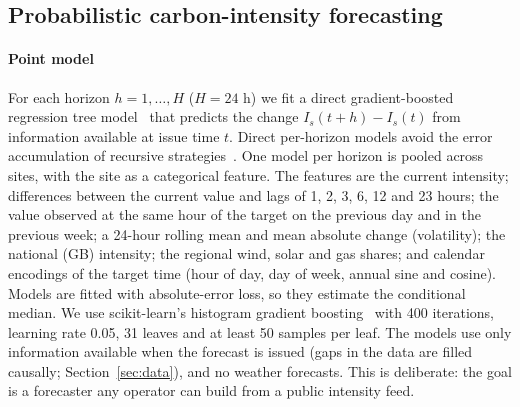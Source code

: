 \subsection{Probabilistic carbon-intensity forecasting}\label{sec:forecast}

\paragraph{Point model} For each horizon $h=1,\dots,H$ ($H=24$ h) we fit a direct gradient-boosted regression tree model~\cite{friedman2001greedy} that predicts the change $I_s(t+h)-I_s(t)$ from information available at issue time $t$. Direct per-horizon models avoid the error accumulation of recursive strategies~\cite{taieb2012review}. One model per horizon is pooled across sites, with the site as a categorical feature. The features are the current intensity; differences between the current value and lags of 1, 2, 3, 6, 12 and 23 hours; the value observed at the same hour of the target on the previous day and in the previous week; a 24-hour rolling mean and mean absolute change (volatility); the national (GB) intensity; the regional wind, solar and gas shares; and calendar encodings of the target time (hour of day, day of week, annual sine and cosine). Models are fitted with absolute-error loss, so they estimate the conditional median. We use scikit-learn's histogram gradient boosting~\cite{pedregosa2011scikit} with 400 iterations, learning rate 0.05, 31 leaves and at least 50 samples per leaf. The models use only information available when the forecast is issued (gaps in the data are filled causally; Section~\ref{sec:data}), and no weather forecasts. This is deliberate: the goal is a forecaster any operator can build from a public intensity feed.

